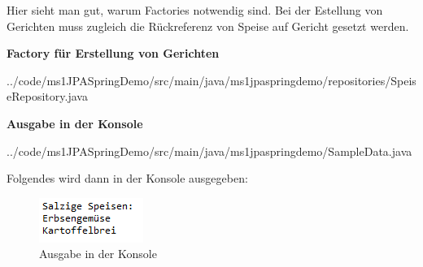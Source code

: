 Hier sieht man gut, warum Factories notwendig sind. 
Bei der Estellung von Gerichten muss zugleich die R\"uckreferenz von 
Speise auf Gericht gesetzt werden.

\begin{mdframed}[style=codebox]
\textbf{Factory für Erstellung von Gerichten}

{../code/ms1JPASpringDemo/src/main/java/ms1jpaspringdemo/repositories/SpeiseRepository.java}
\end{mdframed}

\begin{mdframed}[style=codebox]
\textbf{Ausgabe in der Konsole}

{../code/ms1JPASpringDemo/src/main/java/ms1jpaspringdemo/SampleData.java}
\end{mdframed}

Folgendes wird dann in der Konsole ausgegeben:

\begin{figure}[H]
\centering
\includegraphics{ms1/screenshots/console.PNG}
\caption{Ausgabe in der Konsole}
\end{figure}

 


